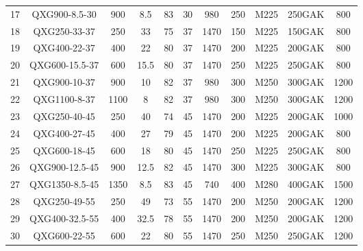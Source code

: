 \begin{table}[H]
{\begin{tabular}{ccccccccccc}
	17    & QXG900-8.5-30 & 900   & 8.5   & 83    & 30    & 980   & 250   & M225  & 250GAK & 800 \\
	18    & QXG250-33-37 & 250   & 33    & 75    & 37    & 1470  & 150   & M225  & 150GAK & 800 \\
	19    & QXG400-22-37 & 400   & 22    & 80    & 37    & 1470  & 200   & M225  & 200GAK & 800 \\
	20    & QXG600-15.5-37 & 600   & 15.5  & 80    & 37    & 1470  & 250   & M225  & 250GAK & 800 \\
	21    & QXG900-10-37 & 900   & 10    & 82    & 37    & 980   & 300   & M250  & 300GAK & 1200 \\
	22    & QXG1100-8-37 & 1100  & 8     & 82    & 37    & 980   & 300   & M250  & 300GAK & 1200 \\
	23    & QXG250-40-45 & 250   & 40    & 74    & 45    & 1470  & 200   & M225  & 200GAK & 1000 \\
	24    & QXG400-27-45 & 400   & 27    & 79    & 45    & 1470  & 200   & M225  & 200GAK & 800 \\
	25    & QXG600-18-45 & 600   & 18    & 80    & 45    & 1470  & 250   & M225  & 250GAK & 800 \\
	26    & QXG900-12.5-45 & 900   & 12.5  & 82    & 45    & 1470  & 300   & M225  & 300GAK & 800 \\
	27    & QXG1350-8.5-45 & 1350  & 8.5   & 83    & 45    & 740   & 400   & M280  & 400GAK & 1500 \\
	28    & QXG250-49-55 & 250   & 49    & 73    & 55    & 1470  & 200   & M250  & 200GAK & 1200 \\
	29    & QXG400-32.5-55 & 400   & 32.5  & 78    & 55    & 1470  & 200   & M250  & 200GAK & 1200 \\
	30    & QXG600-22-55 & 600   & 22    & 80    & 55    & 1470  & 250   & M250  & 250GAK & 1200 \\
	\bottomrule
	\end{tabular}}
	\label{tab:QXG type submersible feed pump}
\end{table}

